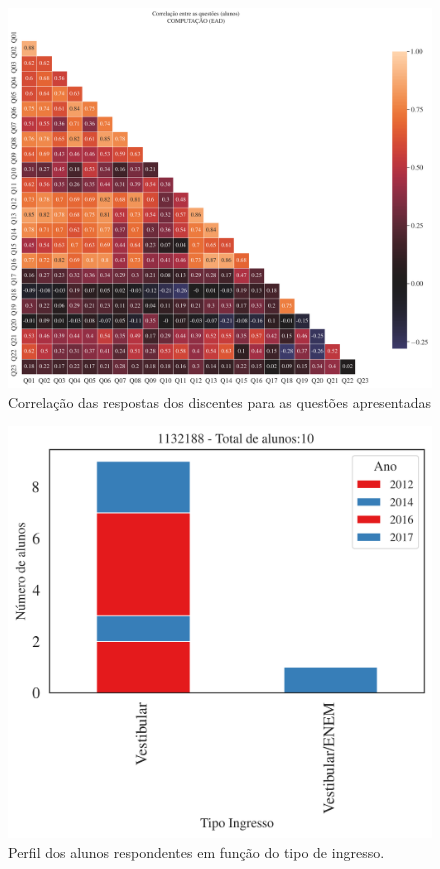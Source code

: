 \documentclass[a4paper,10pt]{article}
\begin{document}
\begin{figure}[h]
\centering
\includegraphics[width=0.999\linewidth]{matriz_corr__1132188}
\caption{\label{fig:corr_alunos}Correlação das respostas dos discentes para as questões apresentadas}
\end{figure}
\begin{figure}[h]
\centering
\includegraphics[width=0.7\linewidth]{ingresso_discentes_curso_ano_1132188}
\caption{\label{fig:ingressoano} Perfil  dos alunos respondentes em função do tipo de ingresso.}
\end{figure}
\end{document}
